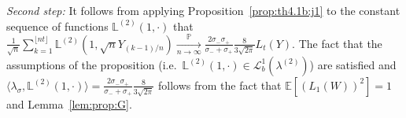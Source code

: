 \documentclass[12pt]{article}
\numberwithin{equation}{section}
\theoremstyle{definition}
\theoremstyle{remark}
\newcommand{\convp}[1][]{\xrightarrow[#1]{\PP}}
\newcommand{\PP}{\mathbb{P}}
\newcommand{\EE}{\mathbb{E}}
\newcommand{\vd}{\,\mathrm{d}}
\newcommand{\Lgb}[1]{\mathcal{L}^{1}_{b}(\lambda^{(#1)})}
\newcommand{\Lm}[3]{\mathbb{L}^{(#2)}(#1,#3)}
\begin{document}
{\it Second step:} 
It follows from applying Proposition~\ref{prop:th4.1b:j1} to the constant sequence of functions $\Lm{1}{2}{\cdot}$ that
$
	\frac1{\sqrt n}  \sum_{k=1}^{\lfloor n t \rfloor} \Lm{1}{2}{\sqrt{n} Y_{(k-1)/n}} \convp[n\to\infty]
	\frac{2 \sigma_- \sigma_+}{\sigma_-+\sigma_+} \frac{8}{3 \sqrt{2 \pi}}
 L_t(Y).
$
%
The fact that the assumptions of the proposition (i.e.~$\Lm{1}{2}{\cdot} \in \Lgb{2}$) are satisfied and 
$\langle \lambda_\sigma , \Lm{1}{2}{\cdot} \rangle = \frac{2 \sigma_- \sigma_+}{\sigma_-+\sigma_+} \frac{8}{3 \sqrt{2 \pi}}$
follows from the fact that $\EE\!\left[ \left( L_1(W)\right)^2\right]= 1$ %
and Lemma~\ref{lem:prop:G}.
\end{document}
